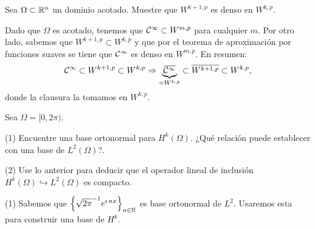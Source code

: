 




\begin{Problema}
	Sea \(\Omega \subset \mathbb{R}^n\) un dominio acotado. Muestre que 
	\(W^{k+1,p}\) es denso en \(W^{k,p}\).
\end{Problema}
\begin{Solucion}
	Dado que \(\Omega\) es acotado, tenemos que \(\mathcal{C}^{\infty}
	\subset W^{m, p}\) para cualquier \(m\). Por otro lado,
	sabemos que \(W^{k+1,p} \subset W^{k,p}\) y que por el teorema
	de aproximación por funciones suaves se tiene que
	\(\mathcal{C}^{\infty}\) es denso en \(W^{m,p}\). En resumen:
	\begin{displaymath}
		\mathcal{C}^{\infty}
		\subset
		W^{k+1, p}
		\subset 
		W^{k,p}
		\Rightarrow
		\underbrace{ 
			\overline{\mathcal{C}^{\infty}}
		}_{=W^{k,p}}
		\subset
		\overline{W^{k+1, p}}
		\subset 
		W^{k,p},
	\end{displaymath}	
	donde la clausura la tomamos en \(W^{k,p}\).
\end{Solucion}

\begin{Problema}
	Sea \(\Omega = [0,2\pi)\).

	\noindent(1) Encuentre una base ortonormal para
	\(H^{k}(\Omega)\). ¿Qué relación puede establecer con una base
	de \(L^{2}(\Omega)\)?. 

	\noindent(2) Use lo anterior para deducir que el operador lineal
	de inclusión \(H^{k}(\Omega) \hookrightarrow L^{2}(\Omega)\) es
	compacto.
\end{Problema}
\begin{Solucion}
	\noindent(1) Sabemos que \(\left\{ \sqrt{2\pi}^{-1} e^{i\,nx}
	\right\}_{n\in\mathbb{N}}\) es base ortonormal de \(L^2\). Usaremos esta
	para construir una base de \(H^k\).
\end{Solucion}



